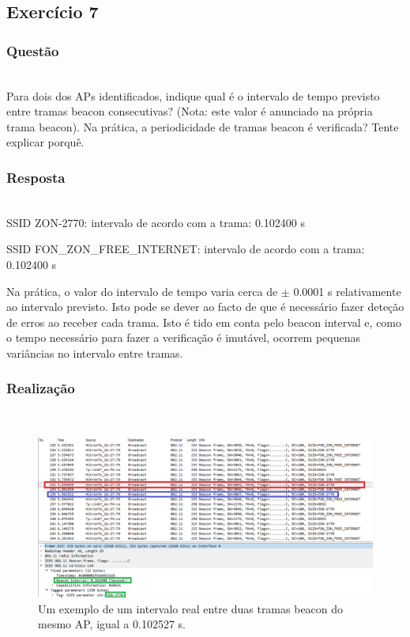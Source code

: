 \documentclass{llncs}
\begin{document}
\clearpage
\subsection{Exercício 7}
\subsubsection{Questão}\rule[-10pt]{0pt}{10pt}\\

Para dois dos APs identificados, indique qual é o intervalo de tempo previsto entre tramas beacon consecutivas? (Nota: este valor é anunciado na própria trama beacon). Na prática, a periodicidade de tramas beacon é verificada? Tente explicar porquê.

\subsubsection{Resposta}\rule[-10pt]{0pt}{10pt}\\

SSID ZON-2770: intervalo de acordo com a trama: 0.102400 s

SSID FON\_ZON\_FREE\_INTERNET: intervalo de acordo com a trama: 0.102400 s

Na prática, o valor do intervalo de tempo varia cerca de $ \pm $ 0.0001 s relativamente ao intervalo previsto. Isto pode se dever ao facto de que é necessário fazer deteção de erros ao receber cada trama. Isto é tido em conta pelo beacon interval e, como o tempo necessário para fazer a verificação é imutável, ocorrem pequenas variâncias no intervalo entre tramas.

\subsubsection{Realização}\rule[-10pt]{0pt}{10pt}\\

\begin{figure}
  \begin{center}
  \includegraphics[scale=0.35]{imagens/ZON_BI.png} 
  \end{center}
  \caption{Um exemplo de um intervalo real entre duas tramas beacon do mesmo AP, igual a 0.102527 s.}
  \label{fig:zon_interval}
\end{figure}
\end{document}
